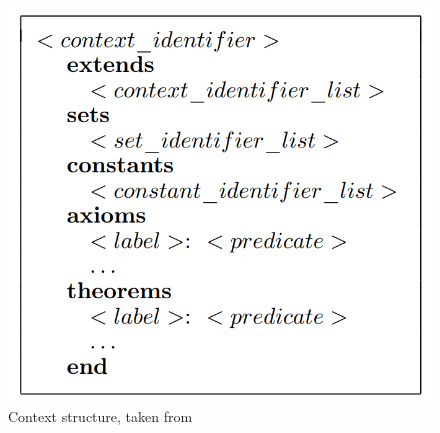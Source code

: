\begin{figure}[h]
    \centering
    \includegraphics[scale = 0.3]{images/eventb2.PNG}
    \caption{Context structure, taken from \cite{Abrial2011}}
    \label{fig:eventb2}
\end{figure}

